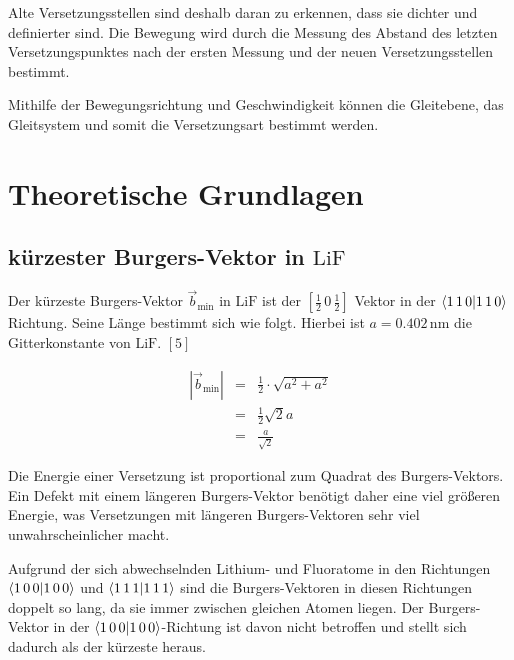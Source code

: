 \documentclass[12pt,a4paper]{scrartcl}
\numberwithin{equation}{section} %
\renewcommand{\[}{} %
\renewcommand{\]}{\noindent} %
\begin{document}
Alte Versetzungsstellen sind deshalb daran zu erkennen, dass sie dichter
und definierter sind. Die Bewegung wird durch die Messung des Abstand
des letzten Versetzungspunktes nach der ersten Messung und der neuen
Versetzungsstellen bestimmt.

Mithilfe der Bewegungsrichtung und Geschwindigkeit können die
Gleitebene, das Gleitsystem und somit die Versetzungsart bestimmt
werden.

\hypertarget{theoretische-grundlagen}{%
\section{Theoretische Grundlagen}\label{theoretische-grundlagen}}

\hypertarget{kuxfcrzester-burgers-vektor-in-mathrmlif}{%
\subsection{\texorpdfstring{kürzester Burgers-Vektor in
\(\mathrm{LiF}\)}{kürzester Burgers-Vektor in \textbackslash mathrm\{LiF\}}}\label{kuxfcrzester-burgers-vektor-in-mathrmlif}}

Der kürzeste Burgers-Vektor \(\vec{b}_\mathrm{min}\) in \(\mathrm{LiF}\)
ist der \([\frac{1}{2}\,0\,\frac{1}{2}]\) Vektor in der
\(\braket{1\,1\,0}\) Richtung. Seine Länge bestimmt sich wie folgt.
Hierbei ist \(a=0.402\,\mathrm{nm}\) die Gitterkonstante von
\(\mathrm{LiF}\). \([5]\)

\[
\begin{eqnarray}
    \left|\vec{b}_\mathrm{min}\right|
        &=& \frac{1}{2} \cdot \sqrt{a^2 + a^2} \\
        &=& \frac{1}{2} \sqrt{2} a \\
        &=& \frac{a}{\sqrt{2}}
\end{eqnarray}
\]

Die Energie einer Versetzung ist proportional zum Quadrat des
Burgers-Vektors. Ein Defekt mit einem längeren Burgers-Vektor benötigt
daher eine viel größeren Energie, was Versetzungen mit längeren
Burgers-Vektoren sehr viel unwahrscheinlicher macht.

Aufgrund der sich abwechselnden Lithium- und Fluoratome in den
Richtungen \(\braket{1\,0\,0}\) und \(\braket{1\,1\,1}\) sind die
Burgers-Vektoren in diesen Richtungen doppelt so lang, da sie immer
zwischen gleichen Atomen liegen. Der Burgers-Vektor in der
\(\braket{1\,0\,0}\)-Richtung ist davon nicht betroffen und stellt sich
dadurch als der kürzeste heraus.
\end{document}
